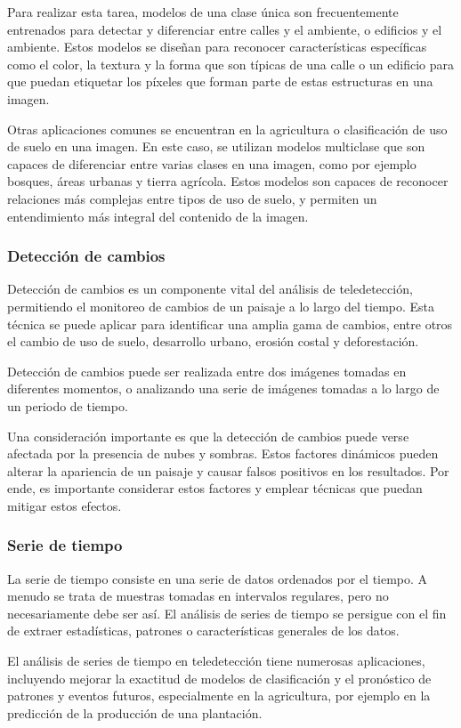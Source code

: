 Para realizar esta tarea, modelos de una clase única son frecuentemente entrenados para detectar y diferenciar entre calles y el ambiente, o edificios y el ambiente. Estos modelos se diseñan para reconocer características específicas como el color, la textura y la forma que son típicas de una calle o un edificio para que puedan etiquetar los píxeles que forman parte de estas estructuras en una imagen. \autocite{cole-segmentation}

Otras aplicaciones comunes se encuentran en la agricultura o clasificación de uso de suelo en una imagen. En este caso, se utilizan modelos multiclase que son capaces de diferenciar entre varias clases en una imagen, como por ejemplo bosques, áreas urbanas y tierra agrícola. Estos modelos son capaces de reconocer relaciones más complejas entre tipos de uso de suelo, y permiten un entendimiento más integral del contenido de la imagen. \autocite{cole-segmentation}

\subsubsection{Detección de cambios}

Detección de cambios es un componente vital del análisis de teledetección, permitiendo el monitoreo de cambios de un paisaje a lo largo del tiempo. Esta técnica se puede aplicar para identificar una amplia gama de cambios, entre otros el cambio de uso de suelo, desarrollo urbano, erosión costal y deforestación. \autocite{repo-satellite-image-dl}

Detección de cambios puede ser realizada entre dos imágenes tomadas en diferentes momentos, o analizando una serie de imágenes tomadas a lo largo de un periodo de tiempo. \autocite{repo-satellite-image-dl}

Una consideración importante es que la detección de cambios puede verse afectada por la presencia de nubes y sombras. Estos factores dinámicos pueden alterar la apariencia de un paisaje y causar falsos positivos en los resultados. Por ende, es importante considerar estos factores y emplear técnicas que puedan mitigar estos efectos. \autocite{repo-satellite-image-dl}

\subsubsection{Serie de tiempo}

La serie de tiempo consiste en una serie de datos ordenados por el tiempo. A menudo se trata de muestras tomadas en intervalos regulares, pero no necesariamente debe ser así. El análisis de series de tiempo se persigue con el fin de extraer estadísticas, patrones o características generales de los datos.

El análisis de series de tiempo en teledetección tiene numerosas aplicaciones, incluyendo mejorar la exactitud de modelos de clasificación y el pronóstico de patrones y eventos futuros, especialmente en la agricultura, por ejemplo en la predicción de la producción de una plantación. \autocite{repo-satellite-image-dl}

